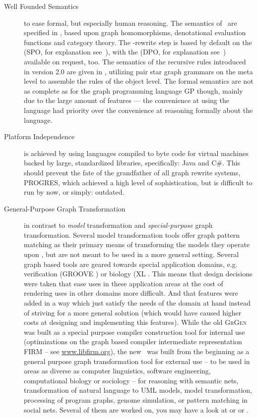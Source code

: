 \begin{description}
\item[Well Founded Semantics]
to ease formal, but especially human reasoning.
The semantics of \GrG\ are specified in \cite{DissRuby}, based upon graph homomorphisms, denotational evaluation functions and category theory.
The \GrG-rewrite step is based by default on the  (SPO, for explanation see~\cite{spoapproach}),
with the  (DPO, for explanation see~\cite{dpoapproach}) available on request, too.
The semantics of the recursive rules introduced in version 2.0 are given in \cite{Jak:08},
utilizing pair star graph grammars on the meta level to assemble the rules of the object level.
The formal semantics are not as complete as for the graph programming language GP\cite{gp} though, mainly due to the large amount of features
--- the convenience at using the language had priority over the convenience at reasoning formally about the language.

\item[Platform Independence]
is achieved by using languages compiled to byte code for virtual machines backed by large, standardized libraries, specifically: Java and C\#.
This should prevent the fate of the grandfather of all graph rewrite systems, PROGRES\cite{schuerr99progres},
which achieved a high level of sophistication, but is difficult to run by now, or simply: outdated.

\item[General-Purpose Graph Transformation]
in contrast to \emph{model} transformation and \emph{special-purpose} graph transformation.
Several model transformation tools offer graph pattern matching as their primary means of transforming the models they operate upon \cite{Jakumeit2013}, but are not meant to be used in a more general setting.
Several graph based tools are geared towards special application domains,
e.g. verification (GROOVE \cite{Groove}) or biology (XL \cite{xl}.
This means that design decisions were taken that ease uses in these application areas at the cost of rendering uses in other domains more difficult.
And that features were added in a way which just satisfy the needs of the domain at hand instead of striving for a more general solution
(which would have caused higher costs at designing and implementing this features).
While the old \textsc{GrGen} was built as a special purpose compiler construction tool for internal use
(optimizations on the graph based compiler intermediate representation FIRM -- see \url{www.libfirm.org}),
the new \GrG\ was built from the beginning as a general purpose graph transformation tool for external use
-- to be used in areas as diverse as computer linguistics, software engineering, computational biology or sociology --
for reasoning with semantic nets, transformation of natural language to UML models,
model transformation, processing of program graphs, genome simulation, or pattern matching in social nets.
Several of them are worked on, you may have a look at \cite{usecomputerlinguistics} or \cite{usemodeltransformation} or \cite{usegeneexpression}.


\end{description}

